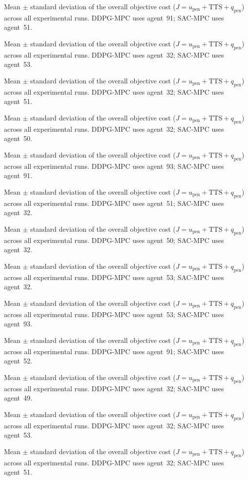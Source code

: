 \begin{table}[htbp]
\centering
\caption{Mean $\pm$ standard deviation of the overall objective cost ($J = u_{\mathrm{pen}} + \mathrm{TTS} + q_{\mathrm{pen}}$) across all experimental runs. DDPG-MPC uses agent~91; SAC-MPC uses agent~51.}
\caption{Mean $\pm$ standard deviation of the overall objective cost ($J = u_{\mathrm{pen}} + \mathrm{TTS} + q_{\mathrm{pen}}$) across all experimental runs. DDPG-MPC uses agent~32; SAC-MPC uses agent~53.}
\caption{Mean $\pm$ standard deviation of the overall objective cost ($J = u_{\mathrm{pen}} + \mathrm{TTS} + q_{\mathrm{pen}}$) across all experimental runs. DDPG-MPC uses agent~32; SAC-MPC uses agent~51.}
\caption{Mean $\pm$ standard deviation of the overall objective cost ($J = u_{\mathrm{pen}} + \mathrm{TTS} + q_{\mathrm{pen}}$) across all experimental runs. DDPG-MPC uses agent~32; SAC-MPC uses agent~50.}
\caption{Mean $\pm$ standard deviation of the overall objective cost ($J = u_{\mathrm{pen}} + \mathrm{TTS} + q_{\mathrm{pen}}$) across all experimental runs. DDPG-MPC uses agent~93; SAC-MPC uses agent~91.}
\caption{Mean $\pm$ standard deviation of the overall objective cost ($J = u_{\mathrm{pen}} + \mathrm{TTS} + q_{\mathrm{pen}}$) across all experimental runs. DDPG-MPC uses agent~51; SAC-MPC uses agent~32.}
\caption{Mean $\pm$ standard deviation of the overall objective cost ($J = u_{\mathrm{pen}} + \mathrm{TTS} + q_{\mathrm{pen}}$) across all experimental runs. DDPG-MPC uses agent~50; SAC-MPC uses agent~32.}
\caption{Mean $\pm$ standard deviation of the overall objective cost ($J = u_{\mathrm{pen}} + \mathrm{TTS} + q_{\mathrm{pen}}$) across all experimental runs. DDPG-MPC uses agent~53; SAC-MPC uses agent~32.}
\caption{Mean $\pm$ standard deviation of the overall objective cost ($J = u_{\mathrm{pen}} + \mathrm{TTS} + q_{\mathrm{pen}}$) across all experimental runs. DDPG-MPC uses agent~53; SAC-MPC uses agent~93.}
\caption{Mean $\pm$ standard deviation of the overall objective cost ($J = u_{\mathrm{pen}} + \mathrm{TTS} + q_{\mathrm{pen}}$) across all experimental runs. DDPG-MPC uses agent~91; SAC-MPC uses agent~52.}
\caption{Mean $\pm$ standard deviation of the overall objective cost ($J = u_{\mathrm{pen}} + \mathrm{TTS} + q_{\mathrm{pen}}$) across all experimental runs. DDPG-MPC uses agent~32; SAC-MPC uses agent~49.}
\caption{Mean $\pm$ standard deviation of the overall objective cost ($J = u_{\mathrm{pen}} + \mathrm{TTS} + q_{\mathrm{pen}}$) across all experimental runs. DDPG-MPC uses agent~32; SAC-MPC uses agent~53.}
\caption{Mean $\pm$ standard deviation of the overall objective cost ($J = u_{\mathrm{pen}} + \mathrm{TTS} + q_{\mathrm{pen}}$) across all experimental runs. DDPG-MPC uses agent~32; SAC-MPC uses agent~51.}

\end{table}
